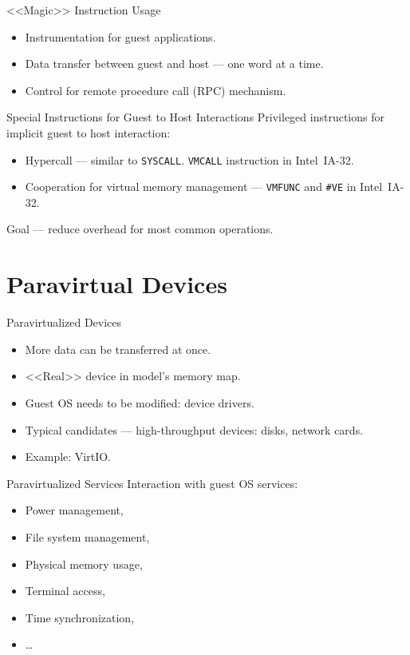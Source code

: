 \begin{frame}{<<Magic>> Instruction Usage}
  \begin{itemize}
    \item Instrumentation for guest applications.
    \item Data transfer between guest and host --- one word at a time.
    \item Control for remote procedure call (RPC) mechanism.
  \end{itemize}
\end{frame}

\begin{frame}{Special Instructions for Guest to Host Interactions}
  Privileged instructions for implicit guest to host interaction:

  \begin{itemize}
    \item Hypercall --- similar to \texttt{SYSCALL}. \texttt{VMCALL}
      instruction in Intel\reg~IA-32.
    \item Cooperation for virtual memory management --- \texttt{VMFUNC} and
      \texttt{\#VE} in Intel\reg~IA-32.
  \end{itemize}

  Goal --- reduce overhead for most common operations.
\end{frame}

\section{Paravirtual Devices}

\begin{frame}{Paravirtualized Devices}
  \begin{itemize}
    \item More data can be transferred at once.
    \item{<<Real>> device in model's memory map.}
    \item Guest OS needs to be modified: device drivers.
    \item Typical candidates --- high-throughput devices: disks, network cards.
    \item Example: VirtIO.
  \end{itemize}
\end{frame}

\begin{frame}{Paravirtualized Services}
  Interaction with guest OS services:
  \begin{itemize}
    \item Power management,
    \item File system management,
    \item Physical memory usage,
    \item Terminal access,
    \item Time synchronization,
    \item \dots
  \end{itemize}
\end{frame}

